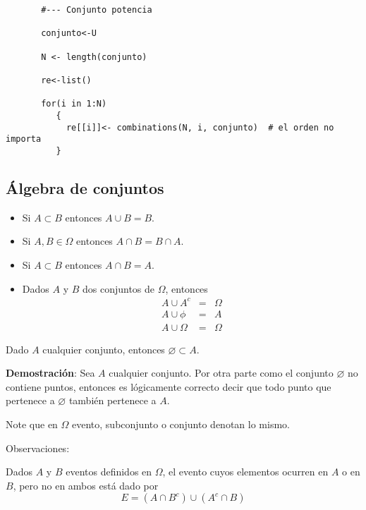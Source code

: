 \begin{lstlisting}
       #--- Conjunto potencia

       conjunto<-U

       N <- length(conjunto) 

       re<-list()

       for(i in 1:N)
          {
            re[[i]]<- combinations(N, i, conjunto)  # el orden no importa
          }
\end{lstlisting}

\subsection{Álgebra de conjuntos}


\begin{property}
\begin{itemize}[b]
    \item Si $A\subset B$ entonces $A\cup B=B$.
    \item Si $A,B\in \Omega$ entonces $A\cap B=B\cap A$.
    \item Si $A\subset B$ entonces $A\cap B=A$.
    \item Dados $A$ y $B$ dos conjuntos de $\Omega$, entonces
    \begin{eqnarray*}
A\cup A^{c}  & = &\Omega \\
A\cup \phi   & = & A \\
A\cup \Omega & = &\Omega
\end{eqnarray*}
\end{itemize}
\end{property}

\begin{property}
Dado $A$ cualquier conjunto, entonces $\varnothing \subset A$.
\end{property}

\textbf{Demostración}: Sea $A$ cualquier conjunto. Por otra parte como el conjunto $\varnothing$ no contiene puntos, entonces es lógicamente correcto decir que todo punto que pertenece a $\varnothing$ también pertenece a $A$.



Note que en $\Omega$ evento, subconjunto o conjunto denotan lo mismo.

Observaciones:

\begin{remark}
Dados $A$ y $B$ eventos definidos en $\Omega$, el evento cuyos elementos ocurren en $A$ o en $B$, pero no en ambos está dado por 
\begin{equation*}
E=(A\cap B^{c})\cup (A^{c}\cap B)
\end{equation*}    
\end{remark}


